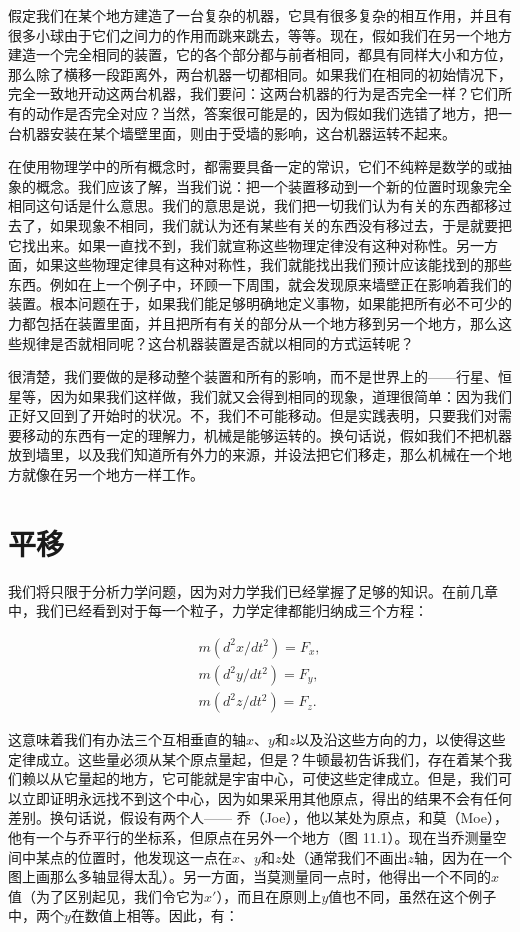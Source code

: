 \documentclass[12pt,oneside]{book}
\begin{document}
假定我们在某个地方建造了一台复杂的机器，它具有很多复杂的相互作用，并且有很多小球由于它们之间力的作用而跳来跳去，等等。现在，假如我们在另一个地方建造一个完全相同的装置，它的各个部分都与前者相同，都具有同样大小和方位，那么除了横移一段距离外，两台机器一切都相同。如果我们在相同的初始情况下，完全一致地开动这两台机器，我们要问：这两台机器的行为是否完全一样？它们所有的动作是否完全对应？当然，答案很可能是的，因为假如我们选错了地方，把一台机器安装在某个墙壁里面，则由于受墙的影响，这台机器运转不起来。

在使用物理学中的所有概念时，都需要具备一定的常识，它们不纯粹是数学的或抽象的概念。我们应该了解，当我们说：把一个装置移动到一个新的位置时现象完全相同这句话是什么意思。我们的意思是说，我们把一切我们认为有关的东西都移过去了，如果现象不相同，我们就认为还有某些有关的东西没有移过去，于是就要把它找出来。如果一直找不到，我们就宣称这些物理定律没有这种对称性。另一方面，如果这些物理定律具有这种对称性，我们就能找出我们预计应该能找到的那些东西。例如在上一个例子中，环顾一下周围，就会发现原来墙壁正在影响着我们的装置。根本问题在于，如果我们能足够明确地定义事物，如果能把所有必不可少的力都包括在装置里面，并且把所有有关的部分从一个地方移到另一个地方，那么这些规律是否就相同呢？这台机器装置是否就以相同的方式运转呢？

很清楚，我们要做的是移动整个装置和所有的影响，而不是世界上的——行星、恒星等，因为如果我们这样做，我们就又会得到相同的现象，道理很简单：因为我们正好又回到了开始时的状况。不，我们不可能移动。但是实践表明，只要我们对需要移动的东西有一定的理解力，机械是能够运转的。换句话说，假如我们不把机器放到墙里，以及我们知道所有外力的来源，并设法把它们移走，那么机械在一个地方就像在另一个地方一样工作。


\section{平移}
我们将只限于分析力学问题，因为对力学我们已经掌握了足够的知识。在前几章中，我们已经看到对于每一个粒子，力学定律都能归纳成三个方程：

\begin{equation}
\begin{aligned}
m(d^2x/dt^2)=F_x,\\[.75ex]
m(d^2y/dt^2)=F_y,\\[.75ex]
m(d^2z/dt^2)=F_z.
\end{aligned}
\label{Eq:I:11:1}
\end{equation}

这意味着我们有办法三个互相垂直的轴$x$、$y$和$z$以及沿这些方向的力，以使得这些定律成立。这些量必须从某个原点量起，但是？牛顿最初告诉我们，存在着某个我们赖以从它量起的地方，它可能就是宇宙中心，可使这些定律成立。但是，我们可以立即证明永远找不到这个中心，因为如果采用其他原点，得出的结果不会有任何差别。换句话说，假设有两个人—— 乔（Joe），他以某处为原点，和莫（Moe），他有一个与乔平行的坐标系，但原点在另外一个地方（图 11.1）。现在当乔测量空间中某点的位置时，他发现这一点在$x$、$y$和$z$处（通常我们不画出$z$轴，因为在一个图上画那么多轴显得太乱）。另一方面，当莫测量同一点时，他得出一个不同的$x$值（为了区别起见，我们令它为$x'$），而且在原则上$y$值也不同，虽然在这个例子中，两个$y$在数值上相等。因此，有：
\end{document}
